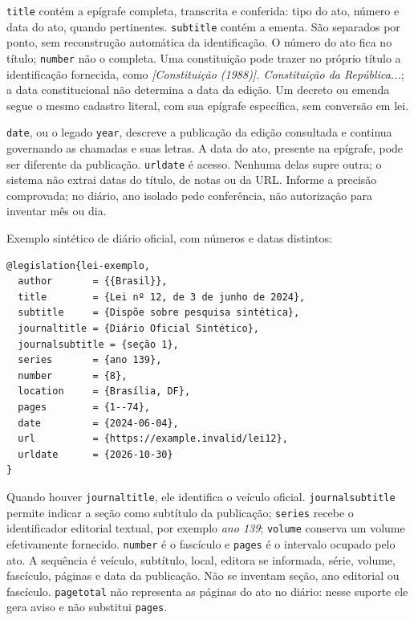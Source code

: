 \texttt{title} contém a epígrafe completa, transcrita e conferida: tipo do ato,
número e data do ato, quando pertinentes. \texttt{subtitle} contém a ementa.
São separados por ponto, sem reconstrução automática da identificação.
O número do ato fica no título; \texttt{number} não o completa.
Uma constituição pode trazer no próprio título a identificação fornecida,
como \emph{[Constituição (1988)]. Constituição da República...}; a data
constitucional não determina a data da edição. Um decreto ou emenda segue o
mesmo cadastro literal, com sua epígrafe específica, sem conversão em lei.

\texttt{date}, ou o legado \texttt{year}, descreve a publicação da edição
consultada e continua governando as chamadas e suas letras. A data do ato,
presente na epígrafe, pode ser diferente da publicação. \texttt{urldate} é acesso.
Nenhuma delas supre outra; o sistema não extrai datas do título, de notas ou da
URL. Informe a precisão comprovada; no diário, ano isolado pede conferência,
não autorização para inventar mês ou dia.

\begin{samepage}
Exemplo sintético de diário oficial, com números e datas distintos:
\begin{verbatim}
@legislation{lei-exemplo,
  author       = {{Brasil}},
  title        = {Lei nº 12, de 3 de junho de 2024},
  subtitle     = {Dispõe sobre pesquisa sintética},
  journaltitle = {Diário Oficial Sintético},
  journalsubtitle = {seção 1},
  series       = {ano 139},
  number       = {8},
  location     = {Brasília, DF},
  pages        = {1--74},
  date         = {2024-06-04},
  url          = {https://example.invalid/lei12},
  urldate      = {2026-10-30}
}
\end{verbatim}
\end{samepage}

Quando houver \texttt{journaltitle}, ele identifica o veículo oficial.
\texttt{journalsubtitle} permite indicar a seção como subtítulo da publicação;
\texttt{series} recebe o identificador editorial textual, por exemplo
\emph{ano 139}; \texttt{volume} conserva um volume efetivamente fornecido.
\texttt{number} é o fascículo e \texttt{pages} é o intervalo ocupado pelo ato.
A sequência é veículo, subtítulo, local, editora se informada, série, volume,
fascículo, páginas e data da publicação. Não se inventam seção, ano editorial
ou fascículo. \texttt{pagetotal} não representa as páginas do ato no diário:
nesse suporte ele gera aviso e não substitui \texttt{pages}.

